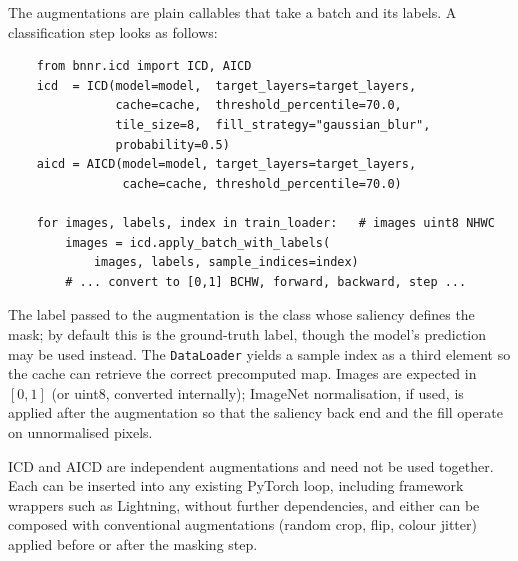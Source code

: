 The augmentations are plain callables that take a batch and its labels.  A
classification step looks as follows:
\begin{verbatim}
    from bnnr.icd import ICD, AICD
    icd  = ICD(model=model,  target_layers=target_layers,
               cache=cache,  threshold_percentile=70.0,
               tile_size=8,  fill_strategy="gaussian_blur",
               probability=0.5)
    aicd = AICD(model=model, target_layers=target_layers,
                cache=cache, threshold_percentile=70.0)

    for images, labels, index in train_loader:   # images uint8 NHWC
        images = icd.apply_batch_with_labels(
            images, labels, sample_indices=index)
        # ... convert to [0,1] BCHW, forward, backward, step ...
\end{verbatim}
The label passed to the augmentation is the class whose saliency defines the
mask; by default this is the ground-truth label, though the model's prediction
may be used instead.  The \texttt{DataLoader} yields a sample index as a third
element so the cache can retrieve the correct precomputed map.  Images are
expected in $[0,1]$ (or uint8, converted internally); ImageNet normalisation, if
used, is applied after the augmentation so that the saliency back end and the
fill operate on unnormalised pixels.

ICD and AICD are independent augmentations and need not be used together.  Each
can be inserted into any existing PyTorch loop, including framework wrappers such
as Lightning, without further dependencies, and either can be composed
with conventional augmentations (random crop, flip, colour jitter) applied
before or after the masking step.
